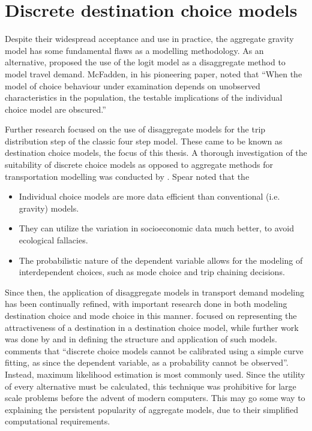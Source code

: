 \section{Discrete destination choice models}
Despite their widespread acceptance and use in practice, the aggregate gravity model has some fundamental flaws as a modelling methodology. As an alternative, \textcite*{McFadden73, Akiva74} proposed the use of the logit model as a disaggregate method to model travel demand. McFadden, in his pioneering paper, noted that \enquote{When the model of choice behaviour under examination depends on unobserved characteristics in the population, the testable implications of the individual choice model are obscured.}\parencite{McFadden73}

Further research focused on the use of disaggregate models for the trip distribution step of the classic four step model. These came to be known as destination choice models, the focus of this thesis. A thorough investigation of the suitability of discrete choice models as opposed to aggregate methods for transportation modelling was conducted by \textcite{Spear77}. Spear noted that the 
\begin{itemize}
\item Individual choice models are more data efficient than conventional (i.e. gravity) models.
\item They can utilize the variation in socioeconomic data much better, to avoid ecological fallacies.
\item The probabilistic nature of the dependent variable allows for the modeling of interdependent choices, such as mode choice and trip chaining decisions. 
\end{itemize}
	
Since then, the application of disaggregate models in transport demand modeling has been continually refined, with important research done in both modeling destination choice and mode choice in this manner. \textcite{Daly82} focused on representing the attractiveness of a destination in a destination choice model, while further work was done by \textcite{Akiva74} and \textcite{Anas81} in defining the structure and application of such models. \textcite{Train09} comments that \enquote{discrete choice models cannot be calibrated using a simple curve fitting, as since the dependent variable, as a probability cannot be observed}. Instead, maximum likelihood estimation is most commonly used. Since the utility of every alternative must be calculated, this technique was prohibitive for large scale problems before the advent of modern computers. This may go some way to explaining the persistent popularity of aggregate models, due to their simplified computational requirements.

